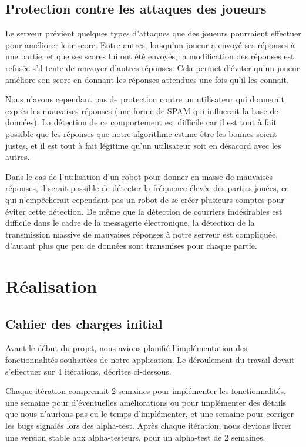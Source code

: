 \documentclass[a4paper,11pt,french]{article}
\begin{document}
\subsection{Protection contre les attaques des joueurs}

Le serveur prévient quelques types d'attaques que des joueurs pourraient effectuer pour améliorer leur score. Entre autres, lorsqu'un joueur
a envoyé ses réponses à une partie, et que ses scores lui ont été envoyés, la modification des réponses est refusée s'il tente de renvoyer
d'autres réponses. Cela permet d'éviter qu'un joueur améliore son score en donnant les réponses attendues une fois qu'il les connait.

Nous n'avons cependant pas de protection contre un utilisateur qui donnerait exprès les mauvaises réponses (une forme de SPAM qui influerait
la base de données). La détection de ce comportement est difficile car il est tout à fait possible que les réponses que notre algorithme
estime être les bonnes soient justes, et il est tout à fait légitime qu'un utilisateur soit en désacord avec les autres.

Dans le cas de l'utilisation d'un robot pour donner en masse de mauvaises réponses, il serait possible de détecter la fréquence élevée des
parties jouées, ce qui n'empêcherait cependant pas un robot de se créer plusieurs comptes pour éviter cette détection. De même que la
détection de courriers indésirables est difficile dans le cadre de la messagerie électronique, la détection de la transmission massive de
mauvaises réponses à notre serveur est compliquée, d'autant plus que peu de données sont transmises pour chaque partie.

\section{Réalisation}
\subsection{Cahier des charges initial}
Avant le début du projet, nous avions planifié l'implémentation des fonctionnalités souhaitées de notre application. Le déroulement du
travail devait s'effectuer sur 4 itérations, décrites ci-dessous.

Chaque itération comprenait 2 semaines pour implémenter les fonctionnalités, une semaine pour d'éventuelles améliorations ou pour
implémenter des détails que nous n'aurions pas eu le temps d'implémenter, et une semaine pour corriger les bugs signalés lors des
alpha-test. Après chaque itération, nous devions livrer une version stable aux alpha-testeurs, pour un alpha-test de 2 semaines.
\end{document}
